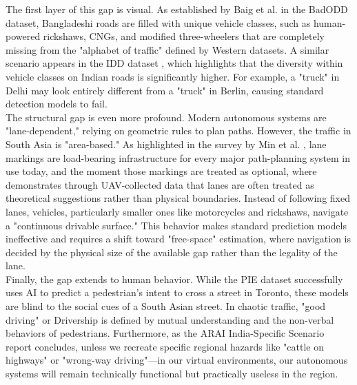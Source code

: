 The first layer of this gap is visual. As established by Baig et al. \cite{Baig2024BadODD} in the BadODD dataset, Bangladeshi roads are filled with unique vehicle classes, such as human-powered rickshaws, CNGs, and modified three-wheelers that are completely missing from the "alphabet of traffic" defined by Western datasets. A similar scenario appears in the IDD dataset \cite{Varma2018IDD}, which highlights that the diversity within vehicle classes on Indian roads is significantly higher. For example, a "truck" in Delhi may look entirely different from a "truck" in Berlin, causing standard detection models to fail.\\

The structural gap is even more profound. Modern autonomous systems are "lane-dependent," relying on geometric rules to plan paths. However, the traffic in South Asia is "area-based." As highlighted in the survey by Min et al. \cite{Li2024Unstructured}, lane markings are load-bearing infrastructure for every major path-planning system in use today, and the moment those markings are treated as optional, where \cite{Ali2025Microscopic} demonstrates through UAV-collected data that lanes are often treated as theoretical suggestions rather than physical boundaries. Instead of following fixed lanes, vehicles, particularly smaller ones like motorcycles and rickshaws, navigate a "continuous drivable surface." This behavior makes standard prediction models ineffective and requires a shift toward "free-space" estimation, where navigation is decided by the physical size of the available gap rather than the legality of the lane.\\

Finally, the gap extends to human behavior. While the PIE dataset \cite{Rasouli2019PIE} successfully uses AI to predict a pedestrian's intent to cross a street in Toronto, these models are blind to the social cues of a South Asian street. In chaotic traffic, "good driving" or Drivership \cite{FraadeBlanar2025Drivership} is defined by mutual understanding and the non-verbal behaviors of pedestrians. Furthermore, as the ARAI India-Specific Scenario report \cite{Pachhapurkar2025ARAI} concludes, unless we recreate specific regional hazards like "cattle on highways" or "wrong-way driving"—in our virtual environments, our autonomous systems will remain technically functional but practically useless in the region.\\


